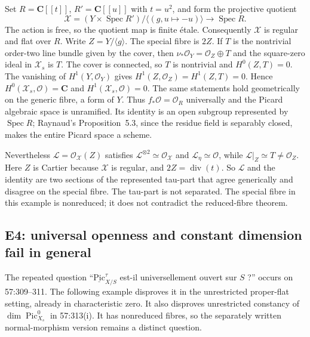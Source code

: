 Set $R=\mathbf C[[t]]$, $R'=\mathbf C[[u]]$ with $t=u^2$, and form the
projective quotient
\[
 \mathcal X=(Y\times\operatorname{Spec}R')/
 \langle(g,u\mapsto-u)\rangle\longrightarrow\operatorname{Spec}R.
\]
The action is free, so the quotient map is finite \'etale. Consequently
$\mathcal X$ is regular and flat over $R$. Write $Z=Y/\langle g\rangle$.
The special fibre is $2Z$. If $T$ is the nontrivial order-two line bundle
given by the cover, then
$\nu_*\mathcal O_Y=\mathcal O_Z\oplus T$ and the square-zero ideal in
$\mathcal X_s$ is $T$. The cover is connected, so $T$ is nontrivial and
$H^0(Z,T)=0$. The vanishing of $H^1(Y,\mathcal O_Y)$ gives
$H^1(Z,\mathcal O_Z)=H^1(Z,T)=0$. Hence
$H^0(\mathcal X_s,\mathcal O)=\mathbf C$ and $H^1(\mathcal X_s,\mathcal O)=0$.
The same statements hold geometrically on the generic fibre, a form of $Y$.
Thus $f_*\mathcal O=\mathcal O_R$ universally and the Picard algebraic space
is unramified. Its identity is an open subgroup represented by $\operatorname{Spec}R$;
Raynaud's Proposition~5.3, since the residue field is separably closed, makes
the entire Picard space a scheme.

Nevertheless $\mathcal L=\mathcal O_{\mathcal X}(Z)$ satisfies
$\mathcal L^{\otimes2}\simeq\mathcal O_{\mathcal X}$ and
$\mathcal L_\eta\simeq\mathcal O$, while $\mathcal L|_Z\simeq T\ne\mathcal O_Z$.
Here $Z$ is Cartier because $\mathcal X$ is regular, and $2Z=\operatorname{div}(t)$.
So $\mathcal L$ and the identity are two sections of the represented tau-part
that agree generically and disagree on the special fibre. The tau-part is not
separated. The special fibre in this example is nonreduced; it does not
contradict the reduced-fibre theorem.

\subsection{E4: universal openness and constant dimension fail in general}

The repeated question ``$\underline{\mathrm{Pic}}^\tau_{X/S}$ est-il
universellement ouvert sur $S$ ?'' occurs on 57:309--311. The following
example disproves it in the unrestricted proper-flat setting, already in
characteristic zero. It also disproves unrestricted constancy of
$\dim\operatorname{Pic}^0_{X_s}$ in 57:313(i). It has nonreduced fibres, so
the separately written normal-morphism version remains a distinct question.

